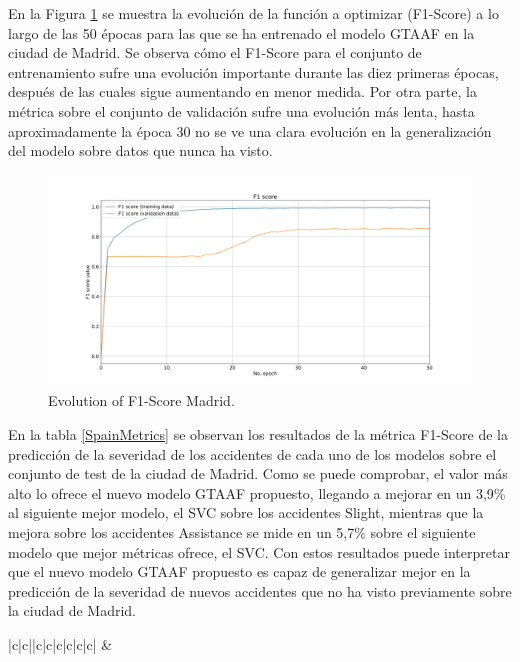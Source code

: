 \documentclass{uathesis-es}
\begin{document}
{En la Figura \ref{MadridLossFunction} se muestra la evolución de la función a optimizar (F1-Score) a lo largo de las 50 épocas para las que se ha entrenado el modelo GTAAF en la ciudad de Madrid. Se observa cómo el F1-Score para el conjunto de entrenamiento sufre una evolución importante durante las diez primeras épocas, después de las cuales sigue aumentando en menor medida. Por otra parte, la métrica sobre el conjunto de validación sufre una evolución más lenta, hasta aproximadamente la época 30 no se ve una clara evolución en la generalización del modelo sobre datos que nunca ha visto.


\begin{figure}[H]
\centering
    \includegraphics[width=160mm]{Figures/Madrid/madrid_convolution_2d_f1_score_2023-12-03-12 54 29.png}
    \caption{Evolution of F1-Score Madrid.}
\label{MadridLossFunction}
\end{figure}

En la tabla \ref{SpainMetrics} se observan los resultados de la métrica F1-Score de la predicción de la severidad de los accidentes de cada uno de los modelos sobre el conjunto de test de la ciudad de Madrid. Como se puede comprobar, el valor más alto lo ofrece el nuevo modelo GTAAF propuesto, llegando a mejorar en un 3,9\% al siguiente mejor modelo, el SVC sobre los accidentes Slight, mientras que la mejora sobre los accidentes Assistance se mide en un 5,7\% sobre el siguiente modelo que mejor métricas ofrece, el SVC. Con estos resultados puede interpretar que el nuevo modelo GTAAF propuesto es capaz de generalizar mejor en la predicción de la severidad de nuevos accidentes que no ha visto previamente sobre la ciudad de Madrid.

\begin{table}[H]
    \begin{center}
        \begin{tabular}{|c|c||c|c|c|c|c|c|}
        \hline
         &
         \\ \hline


\end{tabular}
\end{center}
\end{table}}
\end{document}
